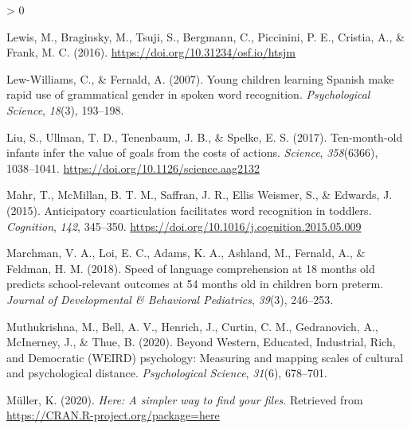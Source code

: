 \documentclass[
  english,
  man,floatsintext]{apa6}
\newlength{\cslhangindent}
\newenvironment{CSLReferences}[2] %
 {%
  \setlength{\parindent}{0pt}
  \ifodd #1 \everypar{\setlength{\hangindent}{\cslhangindent}}\ignorespaces\fi
  \ifnum #2 > 0
  \setlength{\parskip}{#2\baselineskip}
  \fi
 }%
 {}
\providecommand{\DIFaddtex}[1]{{\protect\color{blue}{#1}}} %
\providecommand{\DIFdeltex}[1]{}                      %
\providecommand{\DIFaddbegin}{} %
\providecommand{\DIFaddend}{} %
\providecommand{\DIFdelbegin}{} %
\providecommand{\DIFdelend}{} %
\providecommand{\DIFadd}[1]{\texorpdfstring{\DIFaddtex{#1}}{#1}} %
\providecommand{\DIFdel}[1]{\texorpdfstring{\DIFdeltex{#1}}{}} %
\newcommand{\DIFscaledelfig}{0.5}
\newlength{\DIFdelgraphicswidth} %
\newlength{\DIFdelgraphicsheight} %
\newcommand{\DIFaddincludegraphics}[2][]{{\color{blue}\fbox{\DIFOincludegraphics[#1]{#2}}}} %
\newcommand{\DIFdelincludegraphics}[2][]{%
\sbox{\DIFdelgraphicsbox}{\DIFOincludegraphics[#1]{#2}}%
\settoboxwidth{\DIFdelgraphicswidth}{\DIFdelgraphicsbox} %
\settoboxtotalheight{\DIFdelgraphicsheight}{\DIFdelgraphicsbox} %
\scalebox{\DIFscaledelfig}{%
\parbox[b]{\DIFdelgraphicswidth}{\usebox{\DIFdelgraphicsbox}\\[-\baselineskip] \rule{\DIFdelgraphicswidth}{0em}}\llap{\resizebox{\DIFdelgraphicswidth}{\DIFdelgraphicsheight}{%
\setlength{\unitlength}{\DIFdelgraphicswidth}%
\begin{picture}(1,1)%
\thicklines\linethickness{2pt} %
{\color[rgb]{1,0,0}\put(0,0){\framebox(1,1){}}}%
{\color[rgb]{1,0,0}\put(0,0){\line( 1,1){1}}}%
{\color[rgb]{1,0,0}\put(0,1){\line(1,-1){1}}}%
\end{picture}%
}\hspace*{3pt}}} %
} %
\DeclareRobustCommand{\DIFaddbegin}{\DIFOaddbegin \let\includegraphics\DIFaddincludegraphics} %
\DeclareRobustCommand{\DIFaddend}{\DIFOaddend \let\includegraphics\DIFOincludegraphics} %
\DeclareRobustCommand{\DIFdelbegin}{\DIFOdelbegin \let\includegraphics\DIFdelincludegraphics} %
\DeclareRobustCommand{\DIFdelend}{\DIFOaddend \let\includegraphics\DIFOincludegraphics} %
\begin{document}
\begin{CSLReferences}{1}{0}
\leavevmode\hypertarget{ref-Lewis2016}{}%
Lewis, M., Braginsky, M., Tsuji, S., Bergmann, C., Piccinini, P. E., Cristia, A., \& Frank, M. C. (2016). \DIFdelbegin %
\DIFdel{A Quantitative Synthesis of Early Language Acquisition Using Meta-Analysis}%
\DIFdel{. }\DIFdelend \DIFaddbegin \emph{{\DIFadd{A Quantitative Synthesis of Early Language Acquisition Using Meta-Analysis}}}\DIFadd{. }\emph{\DIFadd{PsyArXiv}}\DIFadd{. }\DIFaddend \url{https://doi.org/10.31234/osf.io/htsjm}

\leavevmode\hypertarget{ref-lewwilliams2007}{}%
Lew-Williams, C., \& Fernald, A. (2007). {Young children learning Spanish make rapid use of grammatical gender in spoken word recognition}. \emph{Psychological Science}, \emph{18}(3), 193--198.

\leavevmode\hypertarget{ref-Liu2017}{}%
Liu, S., Ullman, T. D., Tenenbaum, J. B., \& Spelke, E. S. (2017). {Ten-month-old infants infer the value of goals from the costs of actions}. \emph{Science}, \emph{358}(6366), 1038--1041. \url{https://doi.org/10.1126/science.aag2132}

\leavevmode\DIFaddbegin \hypertarget{ref-macwhinney2000}{}%
\DIFadd{MacWhinney, B. (2000). }\emph{{\DIFadd{The CHILDES Project: Tools for analyzing talk}}}\DIFadd{. Mahwah, NJ: Lawrence Erlbaum Associates.
}

\leavevmode\DIFaddend \hypertarget{ref-Mahr2015}{}%
Mahr, T., McMillan, B. T. M., Saffran, J. R., Ellis Weismer, S., \& Edwards, J. (2015). {Anticipatory coarticulation facilitates word recognition in toddlers}. \emph{Cognition}, \emph{142}, 345--350. \url{https://doi.org/10.1016/j.cognition.2015.05.009}

\leavevmode\hypertarget{ref-marchman2018}{}%
Marchman, V. A., Loi, E. C., Adams, K. A., Ashland, M., Fernald, A., \& Feldman, H. M. (2018). {Speed of language comprehension at 18 months old predicts school-relevant outcomes at 54 months old in children born preterm}. \emph{Journal of Developmental {\&} Behavioral Pediatrics}, \emph{39}(3), 246--253.

\leavevmode\hypertarget{ref-muthukrishna2020}{}%
Muthukrishna, M., Bell, A. V., Henrich, J., Curtin, C. M., Gedranovich, A., McInerney, J., \& Thue, B. (2020). {Beyond Western, Educated, Industrial, Rich, and Democratic (WEIRD) psychology: Measuring and mapping scales of cultural and psychological distance}. \emph{Psychological Science}, \emph{31}(6), 678--701.

\leavevmode\hypertarget{ref-R-here}{}%
Müller, K. (2020). \emph{Here: A simpler way to find your files}. Retrieved from \url{https://CRAN.R-project.org/package=here}


\end{CSLReferences}
\end{document}
